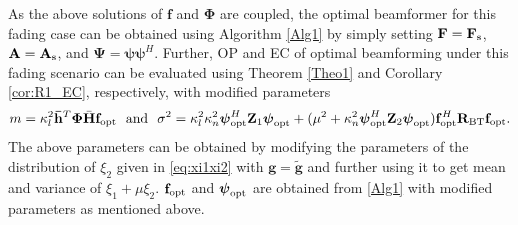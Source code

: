 \documentclass[journal,draftclsnofoot,onecolumn,12pt]{IEEEtran}
\begin{document}
As the  above solutions of $\mathbf{f}$ and $\mathbf{\Phi}$ are coupled, the optimal beamformer for this fading case can be obtained using Algorithm \ref{Alg1} by simply setting  $\mathbf{F}=\mathbf{F}_{\rm s}$, $\mathbf{A}=\mathbf{A}_{\rm s}$, and $\mathbf{\Psi}=\boldsymbol{\psi\psi}^H$. Further, OP and EC of optimal beamforming under this fading scenario can be evaluated using Theorem \ref{Theo1} and Corollary \ref{cor:R1_EC}, respectively, with modified parameters 
\begin{align}
    m=\kappa_l^2\mathbf{\Bar{h}}^T \mathbf{\Phi}\Bar{\mathbf{H}}\mathbf{f}_{\rm opt} \text{~~and~~} \sigma^2=\kappa_l^2 \kappa_n^2 \boldsymbol{\psi}_{\rm opt} ^H \mathbf{Z}_1 \boldsymbol{\psi}_{\rm opt}  +  ( \mu^2 + \kappa_n^2 \boldsymbol{\psi}_{\rm opt} ^H \mathbf{Z}_2 \boldsymbol{\psi}_{\rm opt} )\mathbf{f}^H_{\rm opt}  \mathbf{R_{\rm BT}} \mathbf{f}_{\rm opt} .
\end{align}
The above parameters can be obtained by modifying the parameters of the distribution of  $\xi_2$ given in \eqref{eq:xi1xi2} with $\mathbf{g}=\mathbf{\tilde{g}}$ and further using it to get mean and variance of $\xi_1+\mu\xi_2$. $\mathbf{f}_{\rm opt}$ and $\boldsymbol{\psi}_{\rm opt}$ are obtained from \autoref{Alg1} with modified parameters as mentioned above. 

\end{document}

